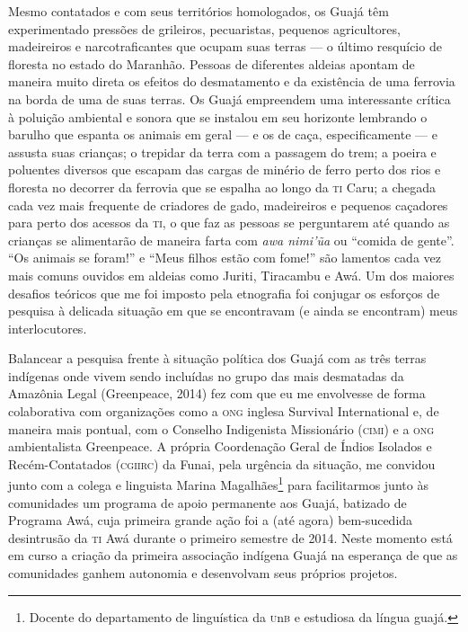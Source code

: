 Mesmo contatados e com seus territórios homologados, os Guajá têm
experimentado pressões de grileiros, pecuaristas, pequenos agricultores,
madeireiros e narcotraficantes que ocupam suas terras --- o último
resquício de floresta no estado do Maranhão. Pessoas de diferentes
aldeias apontam de maneira muito direta os efeitos do desmatamento e da
existência de uma ferrovia na borda de uma de suas terras. Os Guajá
empreendem uma interessante crítica à poluição ambiental e sonora que se
instalou em seu horizonte lembrando o barulho que espanta os animais em
geral --- e os de caça, especificamente --- e assusta suas crianças; o
trepidar da terra com a passagem do trem; a poeira e poluentes diversos
que escapam das cargas de minério de ferro perto dos rios e floresta no
decorrer da ferrovia que se espalha ao longo da \textsc{ti} Caru; a chegada cada
vez mais frequente de criadores de gado, madeireiros e pequenos
caçadores para perto dos acessos da \textsc{ti}, o que faz as pessoas se
perguntarem até quando as crianças se alimentarão de maneira farta com
\textit{awa nimi'ũa} ou ``comida de gente''. ``Os animais se foram!'' e
``Meus filhos estão com fome!'' são lamentos cada vez mais comuns
ouvidos em aldeias como Juriti, Tiracambu e Awá. Um dos maiores desafios
teóricos que me foi imposto pela etnografia foi conjugar os esforços de
pesquisa à delicada situação em que se encontravam (e ainda se
encontram) meus interlocutores.

Balancear a pesquisa frente à situação política dos Guajá com as três
terras indígenas onde vivem sendo incluídas no grupo das mais desmatadas
da Amazônia Legal (Greenpeace, 2014) fez com que eu me envolvesse de
forma colaborativa com organizações como a \textsc{ong} inglesa Survival
International e, de maneira mais pontual, com o Conselho Indigenista
Missionário (\textsc{cimi}) e a \textsc{ong} ambientalista Greenpeace. A própria
Coordenação Geral de Índios Isolados e Recém-Contatados (\textsc{cgiirc}) da
Funai, pela urgência da situação, me convidou junto com a colega e
linguista Marina Magalhães\footnote{Docente do departamento de linguística da
\textsc{u}n\textsc{b} e estudiosa da língua guajá.} para facilitarmos junto às comunidades
um programa de apoio permanente aos Guajá, batizado de Programa Awá,
cuja primeira grande ação foi a (até agora) bem-sucedida desintrusão da
\textsc{ti} Awá durante o primeiro semestre de 2014. Neste momento está em curso
a criação da primeira associação indígena Guajá na esperança de que as
comunidades ganhem autonomia e desenvolvam seus próprios projetos.

